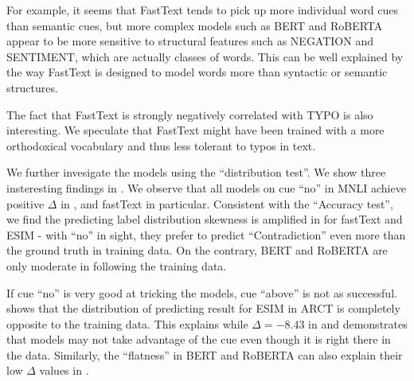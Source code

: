 For example, it seems that FastText tends to pick up more individual word cues
than semantic cues, but more complex models such as BERT
and RoBERTA appear to be more sensitive to structural features such as NEGATION
and SENTIMENT, which are actually classes of words. 
This can be well explained by the way FastText is designed to
model words more than syntactic or semantic structures.

The fact that FastText is strongly negatively correlated with TYPO is
also interesting. We speculate that FastText might have been
trained with a more orthodoxical vocabulary and thus less
tolerant to typos in text. 

We further invesigate the models using the
``distribution test''. 
We show three insteresting findings in . 
We observe that all models on cue ``no'' in MNLI 
achieve positive $\Delta$ in , and fastText in particular. 
Consistent with the ``Accuracy test'', we find the predicting label distribution 
skewness is amplified in  for fastText and ESIM -  
with ``no'' in sight, they prefer to predict ``Contradiction'' even more
than the ground truth in training data.
On the contrary, BERT and RoBERTA are only moderate in following
the training data. 

If cue ``no'' is very good at tricking the models,
cue ``above'' is not as successful. 
 shows that 
the distribution of predicting result for ESIM in ARCT 
is completely opposite to the training data. 
This explains while $\Delta=-8.43$ in  and
demonstrates that models may not take advantage of the cue even though it is
right there in the data.
Similarly, the ``flatness'' in BERT and RoBERTA 
can also explain their low $\Delta$ values in . 

